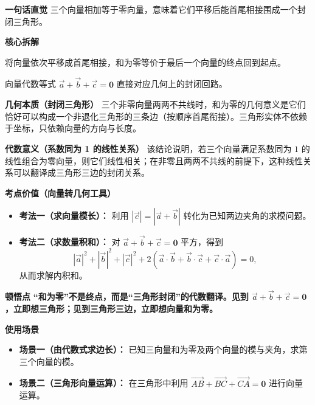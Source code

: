 \begin{explanationbox}
	\textbf{\textcolor{CExplanation}{一句话直觉}}
	三个向量相加等于零向量，意味着它们平移后能首尾相接围成一个封闭三角形。

	\medskip
	\textbf{\textcolor{CExplanation}{核心拆解}}
	\begin{description}[style=nextline, leftmargin=2.8em, labelsep=0.5em, itemsep=0.45em]
		\item[\textbf{要点一（向量平移首尾接）：}]
		      将向量依次平移成首尾相接，和为零等价于最后一个向量的终点回到起点。
		\item[\textbf{要点二（和为零与封闭性）：}]
		      向量代数等式 $\vec{a}+\vec{b}+\vec{c}=\mathbf{0}$ 直接对应几何上的封闭回路。
	\end{description}

	\medskip
	\textbf{\textcolor{CExplanation}{几何本质（封闭三角形）}}
	三个非零向量两两不共线时，和为零的几何意义是它们恰好可以构成一个非退化三角形的三条边（按顺序首尾衔接）。三角形实体不依赖于坐标，只依赖向量的方向与长度。

	\medskip
	\textbf{\textcolor{CExplanation}{代数意义（系数同为 1 的线性关系）}}
	该结论说明，若三个向量满足系数同为 $1$ 的线性组合为零向量，则它们线性相关；在非零且两两不共线的前提下，这种线性关系可以翻译成三角形三边的封闭关系。

	\medskip
	\textbf{\textcolor{CExplanation}{考点价值（向量转几何工具）}}
	\begin{itemize}[leftmargin=*, itemsep=0.5em, topsep=0.4em]
		\item \textbf{考法一（求向量模长）：} 利用 $|\vec{c}| = |\vec{a}+\vec{b}|$ 转化为已知两边夹角的求模问题。
		\item \textbf{考法二（求数量积和）：} 对 $\vec{a}+\vec{b}+\vec{c}=\mathbf{0}$ 平方，得到
		      \[
			      |\vec{a}|^2+|\vec{b}|^2+|\vec{c}|^2
			      +2(\vec{a}\cdot\vec{b}+\vec{b}\cdot\vec{c}+\vec{c}\cdot\vec{a})=0,
		      \]
		      从而求解内积和。
	\end{itemize}

	\medskip
	\textbf{\textcolor{CExplanation}{顿悟点}}
	\textbf{“和为零”不是终点，而是“三角形封闭”的代数翻译。见到 $\vec{a}+\vec{b}+\vec{c}=\mathbf{0}$，立即想三角形；见到三角形三边，立即想向量和为零。}

	\medskip
	\textbf{\textcolor{CExplanation}{使用场景}}
	\begin{itemize}[leftmargin=*, itemsep=0.5em, topsep=0.4em]
		\item \textbf{场景一（由代数式求边长）：} 已知三向量和为零及两个向量的模与夹角，求第三个向量的模。
		\item \textbf{场景二（三角形向量运算）：} 在三角形中利用 $\overrightarrow{AB}+\overrightarrow{BC}+\overrightarrow{CA}=\mathbf{0}$ 进行向量运算。
	\end{itemize}

\end{explanationbox}
